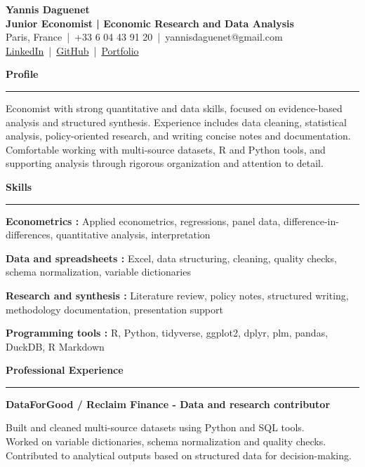 \documentclass[11pt,a4paper]{article}
\newcommand{\sectiontitle}[1]{\vspace{0.26cm}\textbf{\large #1}\vspace{0.10cm}\hrule\vspace{0.13cm}}
\begin{document}
\begin{center}
{\Large \textbf{Yannis Daguenet} }\\
\textbf{Junior Economist | Economic Research and Data Analysis}\\
Paris, France \,|\, +33 6 04 43 91 20 \,|\, yannisdaguenet@gmail.com \\
\href{https://linkedin.com/in/yannis-daguenet}{LinkedIn} \,|\, \href{https://github.com/DaguenetYannis}{GitHub} \,|\, \href{https://daguenetyannisportfolio.netlify.app/}{Portfolio}\end{center}

\sectiontitle{Profile}

Economist with strong quantitative and data skills, focused on evidence-based analysis and structured synthesis. Experience includes data cleaning, statistical analysis, policy-oriented research, and writing concise notes and documentation. Comfortable working with multi-source datasets, R and Python tools, and supporting analysis through rigorous organization and attention to detail.

\sectiontitle{Skills}

\textbf{Econometrics :} Applied econometrics, regressions, panel data, difference-in-differences, quantitative analysis, interpretation

\vspace{0.08cm}
\textbf{Data and spreadsheets :} Excel, data structuring, cleaning, quality checks, schema normalization, variable dictionaries

\vspace{0.08cm}
\textbf{Research and synthesis :} Literature review, policy notes, structured writing, methodology documentation, presentation support

\vspace{0.08cm}
\textbf{Programming tools :} R, Python, tidyverse, ggplot2, dplyr, plm, pandas, DuckDB, R Markdown


\sectiontitle{Professional Experience}

\textbf{DataForGood / Reclaim Finance - Data and research contributor} \hfill  \hfill 

Built and cleaned multi-source datasets using Python and SQL tools.\\
Worked on variable dictionaries, schema normalization and quality checks.\\
Contributed to analytical outputs based on structured data for decision-making.\\
\end{document}
